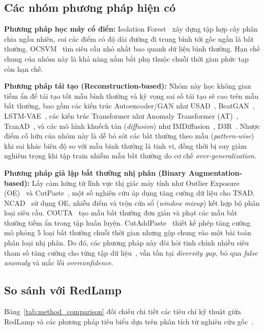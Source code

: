 \documentclass[sigconf,nonacm]{acmart}
\begin{document}
\subsection{Các nhóm phương pháp hiện có}

\textbf{Phương pháp học máy cổ điển:} Isolation Forest~\cite{liu2008} xây dựng tập hợp cây phân chia ngẫu nhiên, coi các điểm có độ dài đường đi trung bình tới gốc ngắn là bất thường. OCSVM~\cite{scholkopf1999} tìm siêu cầu nhỏ nhất bao quanh dữ liệu bình thường. Hạn chế chung của nhóm này là khả năng nắm bắt phụ thuộc chuỗi thời gian phức tạp còn hạn chế.

\textbf{Phương pháp tái tạo (Reconstruction-based):} Nhóm này học không gian tiềm ẩn để tái tạo tốt mẫu bình thường và kỳ vọng sai số tái tạo sẽ cao trên mẫu bất thường, bao gồm các kiến trúc Autoencoder/GAN như USAD~\cite{audibert2020}, BeatGAN~\cite{zhou2019}, LSTM-VAE~\cite{park2018}, các kiến trúc Transformer như Anomaly Transformer (AT)~\cite{xu2022}, TranAD~\cite{tuli2022}, và các mô hình khuếch tán (\textit{diffusion}) như IMDiffusion~\cite{zhang2023}, D3R~\cite{wang2024d3r}. Nhược điểm cố hữu của nhóm này là dễ bỏ sót các bất thường theo mẫu (\textit{pattern-wise}) khi sai khác biên độ so với mẫu bình thường là tinh vi, đồng thời bị suy giảm nghiêm trọng khi tập train nhiễm mẫu bất thường do cơ chế \textit{over-generalization}.

\textbf{Phương pháp giả lập bất thường nhị phân (Binary Augmentation-based):} Lấy cảm hứng từ lĩnh vực thị giác máy tính như Outlier Exposure (OE)~\cite{hendrycks2019} và CutPaste~\cite{li2021}, một số nghiên cứu áp dụng tăng cường dữ liệu cho TSAD. NCAD~\cite{carmona2022} sử dụng OE, nhiễu điểm và trộn cửa sổ (\textit{window mixup}) kết hợp bộ phân loại siêu cầu. COUTA~\cite{xu2024} tạo mẫu bất thường đơn giản và phạt các mẫu bất thường tiềm ẩn trong tập huấn luyện. CutAddPaste~\cite{wang2024} thiết kế phép tăng cường mô phỏng 5 loại bất thường chuỗi thời gian nhưng gộp chung vào một bài toán phân loại nhị phân. Do đó, các phương pháp này đòi hỏi tinh chỉnh nhiều siêu tham số tăng cường cho từng tập dữ liệu~\cite{yoo2023}, vẫn tồn tại \textit{diversity gap}, bỏ qua \textit{false anomaly} và mắc lỗi \textit{overconfidence}.

\subsection{So sánh với RedLamp}

Bảng~\ref{tab:method_comparison} đối chiếu chi tiết các tiêu chí kỹ thuật giữa RedLamp và các phương pháp tiêu biểu dựa trên phân tích từ nghiên cứu gốc~\cite{obata2025}.
\end{document}
